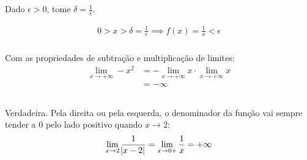 \documentclass[12pt]{article}
\theoremstyle{definition}
\begin{document}
\section{}
\subsection{}
\subsubsection{}
Dado \(\epsilon > 0\), tome \(\delta = \frac{1}{\epsilon}\).

\begin{align*}
	0 > x > \delta = \frac{1}{\epsilon}
	\implies f(x) = \frac{1}{x} < \epsilon
\end{align*}
\subsubsection{}
Com as propriedades de subtração e multiplicação de limites:
\begin{align*}
	\lim_{x\rightarrow +\infty} -x^2
	&= -\lim_{x\rightarrow +\infty} x \cdot \lim_{x\rightarrow +\infty} x \\
	&= -\infty
\end{align*}

\subsection{}
\subsubsection{}

Verdadeira. Pela direita ou pela esquerda, o denominador da função vai sempre tender a \(0\) pelo lado positivo quando \(x\rightarrow 2\):
\begin{align*}
	\lim_{x\rightarrow 2} \frac{1}{\abs{x-2}} = \lim_{x\rightarrow 0+} \frac{1}{x} = +\infty
\end{align*}

\subsubsection{}
\end{document}
